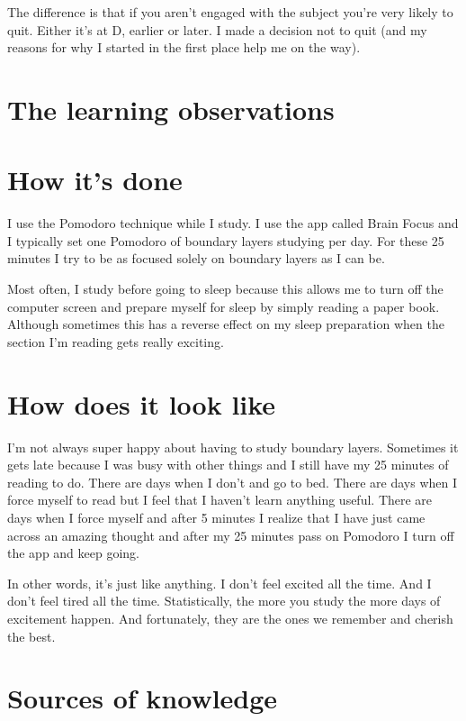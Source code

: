 \documentclass[12pt]{report}
\begin{document}
The difference is that if you aren't engaged with the subject you're very likely to quit. Either it's at D, earlier or later. I made a decision not to quit (and my reasons for why I started in the first place help me on the way). 


\section{The learning observations} \label{chap:learning_observations}


\section{How it's done}

I use the Pomodoro technique while I study. I use the app called Brain Focus and I typically set one Pomodoro of boundary layers studying per day. For these 25 minutes I try to be as focused solely on boundary layers as I can be.

Most often, I study before going to sleep because this allows me to turn off the computer screen and prepare myself for sleep by simply reading a paper book. Although sometimes this has a reverse effect on my sleep preparation when the section I'm reading gets really exciting.

\section{How does it look like}

I'm not always super happy about having to study boundary layers. Sometimes it gets late because I was busy with other things and I still have my 25 minutes of reading to do. There are days when I don't and go to bed. There are days when I force myself to read but I feel that I haven't learn anything useful. There are days when I force myself and after 5 minutes I realize that I have just came across an amazing thought and after my 25 minutes pass on Pomodoro I turn off the app and keep going. 

In other words, it's just like anything. I don't feel excited all the time. And I don't feel tired all the time. Statistically, the more you study the more days of excitement happen. And fortunately, they are the ones we remember and cherish the best.





\section{Sources of knowledge}
\end{document}
